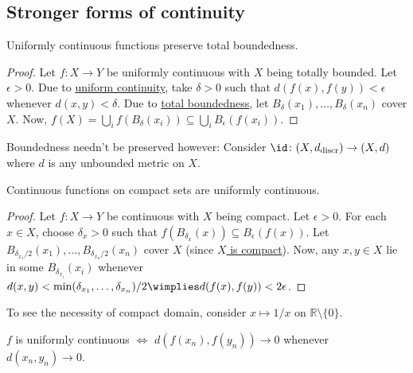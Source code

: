\subsection{Stronger forms of continuity}
	
	\begin{lem}
		Uniformly continuous functions preserve total boundedness.
	\end{lem}
	
	\begin{proof}
		Let $f\colon X\to Y$ be uniformly continuous with $X$ being totally bounded. Let $\epsilon > 0$. Due to \uline{uniform continuity}, take $\delta > 0$ such that $d(f(x), f(y)) < \epsilon$ whenever $d(x, y) < \delta$. Due to \uline{total boundedness}, let $B_\delta(x_1), \ldots, B_\delta(x_n)$ cover $X$. Now, $f(X) = \bigcup_i f(B_\delta(x_i))\subseteq \bigcup_i B_\epsilon(f(x_i))$.
	\end{proof}
	
	\begin{rmk}
		Boundedness needn't be preserved however: Consider $\id\colon(X, d_\text{discr})\to(X, d)$ where $d$ is any unbounded metric on $X$.
	\end{rmk}
	
	
	\begin{prp}\label{PRP: cont funcs on compact are unif cont}
		Continuous functions on compact sets are uniformly continuous.
	\end{prp}
	
	\begin{proof}
		Let $f\colon X\to Y$ be continuous with $X$ being compact. Let $\epsilon > 0$. For each $x\in X$, choose $\delta_x > 0$ such that $f(B_{\delta_x}(x))\subseteq B_\epsilon(f(x))$.
		Let $B_{\delta_{x_1}/2}(x_1), \ldots, B_{\delta_{x_n}/2}(x_n)$ cover $X$ (since \uline{$X$ is compact}). Now, any $x, y\in X$ lie in some $B_{\delta_{x_i}}(x_i)$ whenever $d(x, y) < \min(\delta_{x_1}, \ldots, \delta_{x_n})/2\wimplies d(f(x), f(y)) < 2\epsilon$.
	\end{proof}
	
	\begin{rmk}
		To see the necessity of compact domain, consider $x\mapsto 1/x$ on $\mathbb R\setminus\{0\}$.
	\end{rmk}
	
	
	\begin{prp}
		$f$ is uniformly continuous $\iff$ $d(f(x_n), f(y_n))\to 0$ whenever $d(x_n, y_n)\to 0$.
	\end{prp}
	
